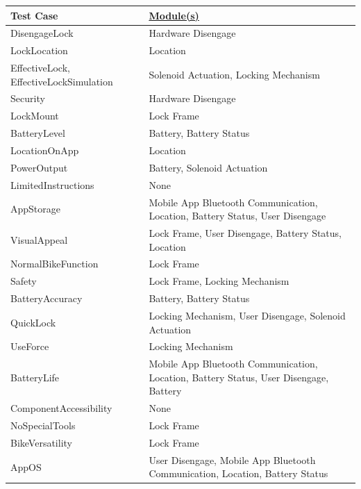 \documentclass[12pt, titlepage]{article}
\begin{document}
\begin{minipage}{\textwidth}
\footnotesize
{}
\renewcommand*{\arraystretch}{1.5}
\begin{tabular}{| p{} | p{} |}
 \hline
 Test Case & \href{https://github.com/NevoAbigail/Capstone/blob/main/docs/Design/SoftArchitecture/MG.pdf}{Module(s)}  \\ 
 \hline
 DisengageLock & Hardware Disengage \\ 
  \hline
 LockLocation & Location \\ 
  \hline
 EffectiveLock, EffectiveLockSimulation & Solenoid Actuation, Locking Mechanism  \\ 
  \hline
 Security & Hardware Disengage\\ 
  \hline
 LockMount & Lock Frame \\ 
  \hline
 BatteryLevel & Battery, Battery Status \\ 
  \hline
 LocationOnApp & Location \\ 
  \hline
 PowerOutput & Battery, Solenoid Actuation \\ 
  \hline
 LimitedInstructions & None \\
 \hline
  AppStorage & Mobile App Bluetooth Communication, Location, Battery Status, User Disengage \\
 \hline
  VisualAppeal & Lock Frame, User Disengage, Battery Status, Location \\
 \hline
  NormalBikeFunction & Lock Frame \\
 \hline
  Safety & Lock Frame, Locking Mechanism \\
 \hline
  BatteryAccuracy & Battery, Battery Status \\
 \hline
  QuickLock & Locking Mechanism, User Disengage, Solenoid Actuation \\
 \hline
 UseForce & Locking Mechanism\\
 \hline
 BatteryLife & Mobile App Bluetooth Communication, Location, Battery Status, User Disengage, Battery \\
 \hline
  ComponentAccessibility & None \\
 \hline
  NoSpecialTools & Lock Frame \\
 \hline
  BikeVersatility & Lock Frame \\
 \hline
  AppOS & User Disengage, Mobile App Bluetooth Communication, Location, Battery Status \\
 \hline
 \end{tabular}
\end{minipage}\\
\end{document}
